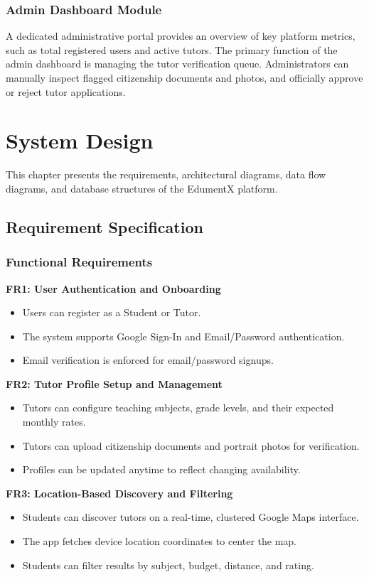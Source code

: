 \documentclass[12pt]{report}
\begin{document}
\subsection{Admin Dashboard Module}
A dedicated administrative portal provides an overview of key platform metrics, such as total registered users and active tutors. The primary function of the admin dashboard is managing the tutor verification queue. Administrators can manually inspect flagged citizenship documents and photos, and officially approve or reject tutor applications.

\chapter{System Design}

This chapter presents the requirements, architectural diagrams, data flow diagrams, and database structures of the EdumentX platform.

\section{Requirement Specification}

\subsection{Functional Requirements}
\noindent \textbf{FR1: User Authentication and Onboarding}
\begin{itemize}
\item Users can register as a Student or Tutor.
\item The system supports Google Sign-In and Email/Password authentication.
\item Email verification is enforced for email/password signups.
\end{itemize}

\smallskip
\noindent \textbf{FR2: Tutor Profile Setup and Management}
\begin{itemize}
\item Tutors can configure teaching subjects, grade levels, and their expected monthly rates.
\item Tutors can upload citizenship documents and portrait photos for verification.
\item Profiles can be updated anytime to reflect changing availability.
\end{itemize}

\smallskip
\noindent \textbf{FR3: Location-Based Discovery and Filtering}
\begin{itemize}
\item Students can discover tutors on a real-time, clustered Google Maps interface.
\item The app fetches device location coordinates to center the map.
\item Students can filter results by subject, budget, distance, and rating.
\end{itemize}
\end{document}
